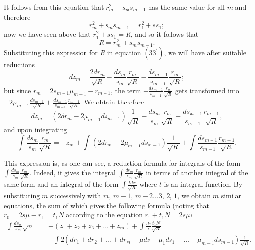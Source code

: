 \documentclass[oneside, 12 pt, leqno]{memoir}
\begin{document}
It follows from this equation that \(r_m^2+s_m s_{m-1}\) has the same value for all \(m\) and therefore
\[r_m^2+s_m s_{m-1}=r_1^2+s s_1;\]
now we have seen above that \(r_1^2+s s_1=R\), and so it follows that
\[\tag{34} R=r_m^2+s_m s_{m-1}.\]
Substituting this expression for \(R\) in equation \(\left(33^{\prime}\right)\), we will have after suitable reductions
\[d z_m=\frac{2 d r_m}{\sqrt{R}}-\frac{d s_m}{s_m} \frac{r_m}{\sqrt{R}}-\frac{d s_{m-1}}{s_{m-1}} \frac{r_m}{\sqrt{R}};\]
but since \(r_m=2 s_{m-1} \mu_{m-1}-r_{m-1}\), the term \(-\frac{d s_{m-1}}{s_{m-1}} \frac{r_m}{\sqrt{R}}\) gets transformed into \(-2 \mu_{m-1} \frac{d s_{m-1}}{\sqrt{R}}+\frac{d s_{m-1}}{s_{m-1}} \frac{r_{m-1}}{\sqrt{R}}\). We obtain therefore
\[d z_m=\left(2 d r_m-2 \mu_{m-1} d s_{m-1}\right) \frac{1}{\sqrt{R}}-\frac{d s_m}{s_m} \frac{r_m}{\sqrt{R}}+\frac{d s_{m-1}}{s_{m-1}} \frac{r_{m-1}}{\sqrt{R}},\]
and upon integrating
\[\tag{35}\int \frac{d s_m}{s_m} \frac{r_m}{\sqrt{R}}=-z_m+\int\left(2 d r_m-2 \mu_{m-1} d s_{m-1}\right) \frac{1}{\sqrt{R}}+\int \frac{d s_{m-1}}{s_{m-1}} \frac{r_{m-1}}{\sqrt{R}}.\]

This expression is, as one can see, a reduction formula for integrals of the form \(\int \frac{d s_m}{s_m} \frac{r_m}{\sqrt{R}}\). Indeed, it gives the integral \(\int \frac{d s_m}{s_m} \frac{r_m}{\sqrt{R}}\) in terms of another integral of the same form and an integral of the form \(\int \frac{t d x}{\sqrt{R}}\) where \(t\) is an integral function. By substituting \(m\) successively with \(m\), \(m-1\), \(m-2 \dots 3\), \(2\), \(1\), we obtain \(m\) similar equations, the sum of which gives the following formula (noting that \(r_0=2 s\mu-r_1=t_1 N\) according to the equation \(r_1+t_1 N=2 s \mu\))
\[\begin{aligned}
\int \frac{d s_m}{s_m} \sqrt{n}=&-\left(z_1+z_2+z_3+\dots+z_m\right)+\int \frac{d s}{s} \frac{t_1 N}{\sqrt{R}} \\
&+\int 2\left(d r_1+d r_2+\dots+d r_m+\mu d s-\mu_1 d s_1-\dots-\mu_{m-1} d s_{m-1}\right) \frac{1}{\sqrt{R}}.
\end{aligned}\]
\end{document}
